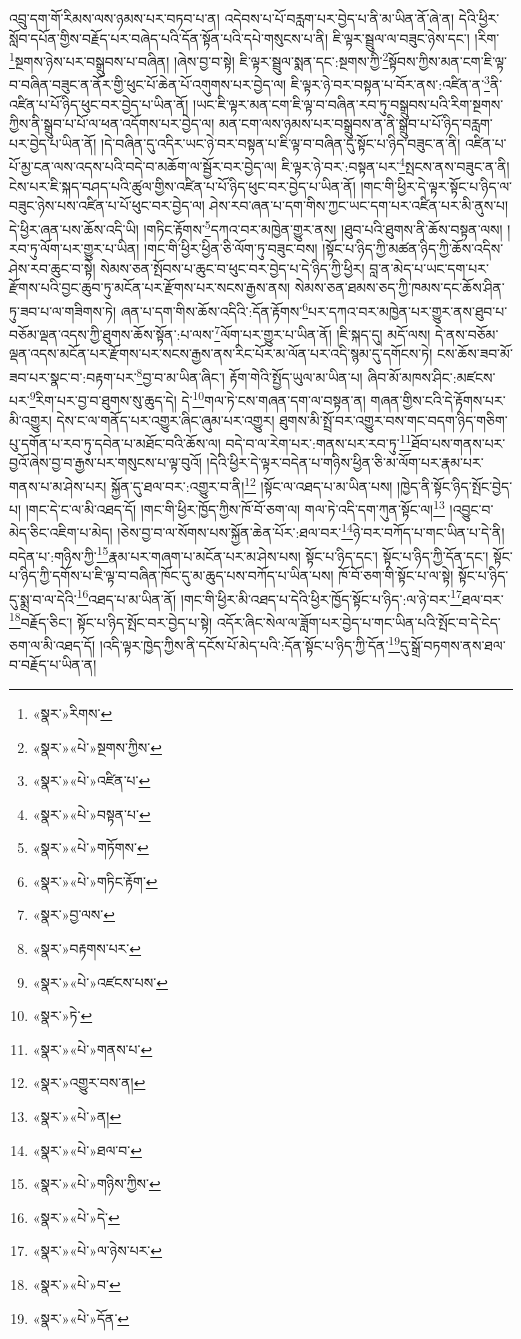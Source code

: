འབྲུ་དག་གོ་རིམས་ལས་ཉམས་པར་བཏབ་པ་ན། འདེབས་པ་པོ་བརླག་པར་བྱེད་པ་ནི་མ་ཡིན་ནོ་ཞེ་ན། དེའི་ཕྱིར་སློབ་དཔོན་གྱིས་བརྗོད་པར་བཞེད་པའི་དོན་སྟོན་པའི་དཔེ་གསུངས་པ་ནི། ཇི་ལྟར་སྦྲུལ་ལ་བཟུང་ཉེས་དང་། །རིག་\footnote{«སྣར་»རིགས་}སྔགས་ཉེས་པར་བསྒྲུབས་པ་བཞིན། །ཞེས་བྱ་བ་སྟེ། ཇི་ལྟར་སྦྲུལ་སྨན་དང་:སྔགས་ཀྱི་\footnote{«སྣར་»«པེ་»སྔགས་ཀྱིས་}སྟོབས་ཀྱིས་མན་ངག་ཇི་ལྟ་བ་བཞིན་བཟུང་ན་ནོར་གྱི་ཕུང་པོ་ཆེན་པོ་འགུགས་པར་བྱེད་ལ། ཇི་ལྟར་ཉེ་བར་བསྟན་པ་བོར་ནས་:འཛིན་ན་\footnote{«སྣར་»«པེ་»འཛིན་པ་}ནི་འཛིན་པ་པོ་ཉིད་ཕུང་བར་བྱེད་པ་ཡིན་ནོ། །ཡང་ཇི་ལྟར་མན་ངག་ཇི་ལྟ་བ་བཞིན་རབ་ཏུ་བསྒྲུབས་པའི་རིག་སྔགས་ཀྱིས་ནི་སྒྲུབ་པ་པོ་ལ་ཕན་འདོགས་པར་བྱེད་ལ། མན་ངག་ལས་ཉམས་པར་བསྒྲུབས་ན་ནི་སྒྲུབ་པ་པོ་ཉིད་བརླག་པར་བྱེད་པ་ཡིན་ནོ། །དེ་བཞིན་དུ་འདིར་ཡང་ཉེ་བར་བསྟན་པ་ཇི་ལྟ་བ་བཞིན་དུ་སྟོང་པ་ཉིད་བཟུང་ན་ནི། འཛིན་པ་པོ་མྱ་ངན་ལས་འདས་པའི་བདེ་བ་མཆོག་ལ་སྦྱོར་བར་བྱེད་ལ། ཇི་ལྟར་ཉེ་བར་:བསྟན་པར་\footnote{«སྣར་»«པེ་»བསྟན་པ་}སྤངས་ནས་བཟུང་ན་ནི། ངེས་པར་ཇི་སྐད་བཤད་པའི་ཚུལ་གྱིས་འཛིན་པ་པོ་ཉིད་ཕུང་བར་བྱེད་པ་ཡིན་ནོ། །གང་གི་ཕྱིར་དེ་ལྟར་སྟོང་པ་ཉིད་ལ་བཟུང་ཉེས་པས་འཛིན་པ་པོ་ཕུང་བར་བྱེད་ལ། ཤེས་རབ་ཞན་པ་དག་གིས་ཀྱང་ཡང་དག་པར་འཛིན་པར་མི་ནུས་པ། དེ་ཕྱིར་ཞན་པས་ཆོས་འདི་ཡི། །གཏིང་རྟོགས་\footnote{«སྣར་»«པེ་»གཏོགས་}དཀའ་བར་མཁྱེན་གྱུར་ནས། །ཐུབ་པའི་ཐུགས་ནི་ཆོས་བསྟན་ལས། །རབ་ཏུ་ལོག་པར་གྱུར་པ་ཡིན། །གང་གི་ཕྱིར་ཕྱིན་ཅི་ལོག་ཏུ་བཟུང་བས། །སྟོང་པ་ཉིད་ཀྱི་མཚན་ཉིད་ཀྱི་ཆོས་འདིས་ཤེས་རབ་ཆུང་བ་སྟེ། སེམས་ཅན་སྤོབས་པ་ཆུང་བ་ཕུང་བར་བྱེད་པ་དེ་ཉིད་ཀྱི་ཕྱིར། བླ་ན་མེད་པ་ཡང་དག་པར་རྫོགས་པའི་བྱང་ཆུབ་ཏུ་མངོན་པར་རྫོགས་པར་སངས་རྒྱས་ནས། སེམས་ཅན་ཐམས་ཅད་ཀྱི་ཁམས་དང་ཆོས་ཤིན་ཏུ་ཟབ་པ་ལ་གཟིགས་ཏེ། ཞན་པ་དག་གིས་ཆོས་འདིའི་:དོན་རྟོགས་\footnote{«སྣར་»«པེ་»གཏིང་རྟོག་}པར་དཀའ་བར་མཁྱེན་པར་གྱུར་ནས་ཐུབ་པ་བཅོམ་ལྡན་འདས་ཀྱི་ཐུགས་ཆོས་སྟོན་:པ་ལས་\footnote{«སྣར་»བྱ་ལས་}ལོག་པར་གྱུར་པ་ཡིན་ནོ། །ཇི་སྐད་དུ། མདོ་ལས། དེ་ནས་བཅོམ་ལྡན་འདས་མངོན་པར་རྫོགས་པར་སངས་རྒྱས་ནས་རིང་པོར་མ་ལོན་པར་འདི་སྙམ་དུ་དགོངས་ཏེ། ངས་ཆོས་ཟབ་མོ་ཟབ་པར་སྣང་བ་:བརྟག་པར་\footnote{«སྣར་»བརྟགས་པར་}བྱ་བ་མ་ཡིན་ཞིང་། རྟོག་གེའི་སྤྱོད་ཡུལ་མ་ཡིན་པ། ཞིབ་མོ་མཁས་ཤིང་:མཛངས་པར་\footnote{«སྣར་»«པེ་»འཛངས་པས་}རིག་པར་བྱ་བ་ཐུགས་སུ་ཆུད་དེ། དེ་\footnote{«སྣར་»ཏེ་}གལ་ཏེ་ངས་གཞན་དག་ལ་བསྟན་ན། གཞན་གྱིས་ངའི་དེ་རྟོགས་པར་མི་འགྱུར། དེས་ང་ལ་གནོད་པར་འགྱུར་ཞིང་ཞུམ་པར་འགྱུར། ཐུགས་མི་སྤྲོ་བར་འགྱུར་བས་གང་བདག་ཉིད་གཅིག་པུ་དགོན་པ་རབ་ཏུ་དབེན་པ་མཐོང་བའི་ཆོས་ལ། བདེ་བ་ལ་རེག་པར་:གནས་པར་རབ་ཏུ་\footnote{«སྣར་»«པེ་»གནས་པ་}ཐོབ་པས་གནས་པར་བྱའོ་ཞེས་བྱ་བ་རྒྱས་པར་གསུངས་པ་ལྟ་བུའོ། །དེའི་ཕྱིར་དེ་ལྟར་བདེན་པ་གཉིས་ཕྱིན་ཅི་མ་ལོག་པར་རྣམ་པར་གནས་པ་མ་ཤེས་པར། སྐྱོན་དུ་ཐལ་བར་:འགྱུར་བ་ནི།\footnote{«སྣར་»འགྱུར་བས་ན།} །སྟོང་ལ་འཐད་པ་མ་ཡིན་པས། །ཁྱེད་ནི་སྟོང་ཉིད་སྤོང་བྱེད་པ། །གང་དེ་ང་ལ་མི་འཐད་དོ། །གང་གི་ཕྱིར་ཁྱོད་ཀྱིས་ཁོ་བོ་ཅག་ལ། གལ་ཏེ་འདི་དག་ཀུན་སྟོང་ལ།\footnote{«སྣར་»«པེ་»ན།} །འབྱུང་བ་མེད་ཅིང་འཇིག་པ་མེད། །ཅེས་བྱ་བ་ལ་སོགས་པས་སྐྱོན་ཆེན་པོར་:ཐལ་བར་\footnote{«སྣར་»«པེ་»ཐལ་བ་}ཉེ་བར་བཀོད་པ་གང་ཡིན་པ་དེ་ནི། བདེན་པ་:གཉིས་ཀྱི་\footnote{«སྣར་»«པེ་»གཉིས་ཀྱིས་}རྣམ་པར་གཞག་པ་མངོན་པར་མ་ཤེས་པས། སྟོང་པ་ཉིད་དང་། སྟོང་པ་ཉིད་ཀྱི་དོན་དང་། སྟོང་པ་ཉིད་ཀྱི་དགོས་པ་ཇི་ལྟ་བ་བཞིན་ཁོང་དུ་མ་ཆུད་པས་བཀོད་པ་ཡིན་པས། ཁོ་བོ་ཅག་གི་སྟོང་པ་ལ་སྟེ། སྟོང་པ་ཉིད་དུ་སྨྲ་བ་ལ་དེའི་\footnote{«སྣར་»«པེ་»དེ་}འཐད་པ་མ་ཡིན་ནོ། །གང་གི་ཕྱིར་མི་འཐད་པ་དེའི་ཕྱིར་ཁྱོད་སྟོང་པ་ཉིད་:ལ་ཉེ་བར་\footnote{«སྣར་»«པེ་»ལ་ཉེས་པར་}ཐལ་བར་\footnote{«སྣར་»«པེ་»བ་}བརྗོད་ཅིང་། སྟོང་པ་ཉིད་སྤོང་བར་བྱེད་པ་སྟེ། འདོར་ཞིང་སེལ་ལ་ཟློག་པར་བྱེད་པ་གང་ཡིན་པའི་སྤོང་བ་དེ་ངེད་ཅག་ལ་མི་འཐད་དོ། །འདི་ལྟར་ཁྱེད་ཀྱིས་ནི་དངོས་པོ་མེད་པའི་:དོན་སྟོང་པ་ཉིད་ཀྱི་དོན་\footnote{«སྣར་»«པེ་»དོན་}དུ་སྒྲོ་བཏགས་ནས་ཐལ་བ་བརྗོད་པ་ཡིན་ན། 